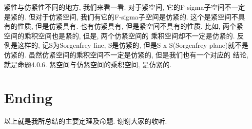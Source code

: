 \documentclass[a4paper,12pt]{ctexart}
\begin{document}
紧性与仿紧性不同的地方, 我们来看一看. 
对于紧空间, 它的F-sigma子空间不一定是紧的. 但对于仿紧空间,
我们有它的F-sigma子空间是仿紧的. 这个是紧空间不具有的性质,
但是仿紧具有. 也有仿紧具有, 但是紧空间不具有的性质.
比如, 两个紧空间的乘积空间也是紧的, 但是, 两个仿紧空间的
乘积空间却不一定是仿紧的. 反例是这样的, 记S为Sorgenfrey line,
S是仿紧的, 但是S x S(Sorgenfrey plane)就不是仿紧的.
虽然仿紧空间的乘积空间不一定是仿紧的, 但是我们也有一个对应的
结论, 就是命题4.0.6. 紧空间与仿紧空间的乘积空间, 是仿紧的.

\section{Ending}
以上就是我所总结的主要定理及命题. 谢谢大家的收听.
\end{document}
